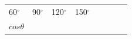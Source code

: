 \begin{center}
\begin{xtabular*}{\mytablewidth}[t]{|p{10\mystarwidth}|p{10\mystarwidth}|p{10\mystarwidth}|p{10\mystarwidth}|p{10\mystarwidth}|p{10\mystarwidth}|p{10\mystarwidth}|p{10\mystarwidth}|}
    
        60\begin{math}{}^{\circ }\end{math} &
    
    
        90\begin{math}{}^{\circ }\end{math} &
    
    
        120\begin{math}{}^{\circ }\end{math} &
    
    
        150\begin{math}{}^{\circ }\end{math} &
    
    
     \tabularnewline{}
    
    
        
                  \begin{math}cos\theta \end{math}
                 &
    
    

\end{xtabular*}
\end{center}
